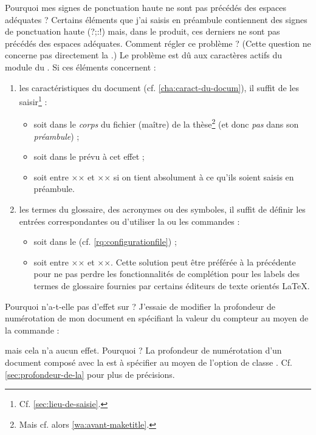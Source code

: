 \begin{dbfaq}{Pourquoi mes signes de ponctuation haute ne sont pas précédés des
    espaces adéquates ?}{}
  Certains éléments que j'ai saisis en préambule contiennent des signes de
  ponctuation haute ({\NoAutoSpacing?;:!}) mais, dans le \pdf produit, ces
  derniers ne sont pas précédés des espaces adéquates. Comment régler ce
  problème ?
  \tcblower
  (Cette question ne concerne pas directement la \yatcl{}.) Le problème est dû
  aux caractères actifs du module  du . Si ces
  éléments concernent :
  \begin{enumerate}
  \item les caractéristiques du document (cf. \vref{cha:caract-du-docum}), il
    suffit de les saisir\footnote{Cf. \vref{sec:lieu-de-saisie}.} :
    \begin{itemize}
    \item soit dans le \emph{corps} du fichier (maître) de la
      thèse\footnote{Mais cf. alors \vref{wa:avant-maketitle}.} (et donc
      \emph{pas} dans son \emph{préambule}) ;
    \item soit dans le \File{\characteristicsfile} prévu à cet effet ;
    \item soit entre ×× et ×× si on tient
      absolument à ce qu'ils soient saisis en préambule.
    \end{itemize}
  \item les termes du glossaire, des acronymes ou des symboles, il suffit de
    définir les entrées correspondantes ou d'utiliser la ou les commandes
     :
    \begin{itemize}
    \item soit dans le \File{\configurationfile}
      (cf. \vref{rq:configurationfile}) ;
    \item soit entre ×× et ××. Cette
      solution peut être préférée à la précédente pour ne pas perdre les
      fonctionnalités de complétion pour les labels des termes de glossaire
      fournies par certains éditeurs de texte orientés \LaTeX{}.
    \end{itemize}
  \end{enumerate}
\end{dbfaq}

\begin{dbfaq}{Pourquoi \protect{} n'a-t-elle pas
    d'effet sur \protect{} ?}{}
  J'essaie de modifier la profondeur de numérotation de mon document en
  spécifiant la valeur du compteur  au moyen de la
  commande :
\begin{preamblecode}
\end{preamblecode}
  mais cela n'a aucun effet. Pourquoi ?
  \tcblower
  La profondeur de numérotation d'un document composé avec la \yatcl{} est
  à spécifier au moyen de l'option de classe
  . Cf. \vref{sec:profondeur-de-la} pour plus de
  précisions.
\end{dbfaq}

